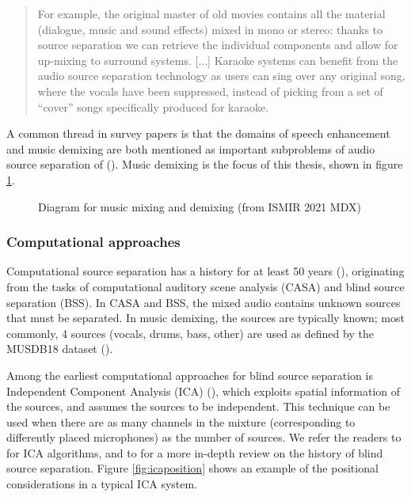 \documentclass[report.tex]{subfiles}
\begin{document}
\begin{quote}
	For example, the original master of old movies contains all the material (dialogue, music and sound effects) mixed in mono or stereo: thanks to source separation we can retrieve the individual components and allow for up-mixing to surround systems. [...] Karaoke systems can benefit from the audio source separation technology as users can sing over any original song, where the vocals have been suppressed, instead of picking from a set of ``cover'' songs specifically produced for karaoke.
\end{quote}

A common thread in survey papers is that the domains of speech enhancement and music demixing are both mentioned as important subproblems of audio source separation of (\cite{musicsepintro1, musicsepsurvey}). Music demixing is the focus of this thesis, shown in figure \ref{fig:mixingdiagrams}.

\begin{figure}[ht]
	\centering
	\caption{Diagram for music mixing and demixing (from ISMIR 2021 MDX)}
	\label{fig:mixingdiagrams}
\end{figure}

\newpagefill

\subsubsection{Computational approaches}

Computational source separation has a history for at least 50 years (\cite{musicsepsurvey, musicsepintro1}), originating from the tasks of computational auditory scene analysis (CASA) and blind source separation (BSS). In CASA and BSS, the mixed audio contains unknown sources that must be separated. In music demixing, the sources are typically known; most commonly, 4 sources (vocals, drums, bass, other) are used as defined by the MUSDB18 dataset (\cite{musdb18}).

Among the earliest computational approaches for blind source separation is Independent Component Analysis (ICA)  (\cite{musicsepsurvey, musicsepgood, musicsepintro1}), which exploits spatial information of the sources, and assumes the sources to be independent. This technique can be used when there are as many channels in the mixture (corresponding to differently placed microphones) as the number of sources. We refer the readers to \textcite{ica1, ica2} for ICA algorithms, and to \textcite{blind1, blind2} for a more in-depth review on the history of blind source separation. Figure \ref{fig:icaposition} shows an example of the positional considerations in a typical ICA system.
\end{document}
